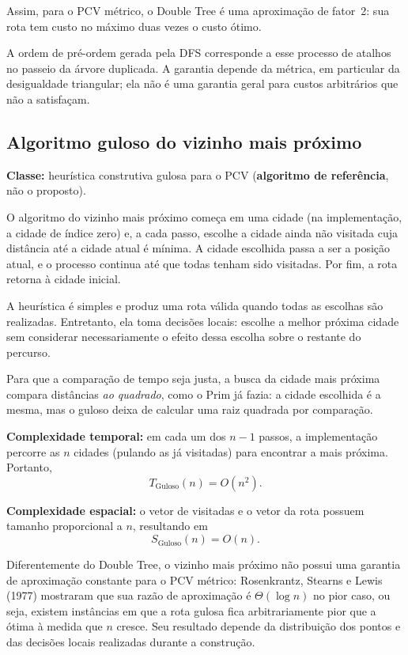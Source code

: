 \documentclass[11pt,a4paper]{article}
\renewcommand{\_}{\underscoreoriginal\allowbreak}
\begin{document}
Assim, para o PCV métrico, o Double Tree é uma aproximação de fator~2:
sua rota tem custo no máximo duas vezes o custo ótimo.

A ordem de pré-ordem gerada pela DFS corresponde a esse processo de
atalhos no passeio da árvore duplicada. A garantia depende da métrica, em
particular da desigualdade triangular; ela não é uma garantia geral para
custos arbitrários que não a satisfaçam.

\subsection{Algoritmo guloso do vizinho mais próximo}
\label{sec:guloso}

\textbf{Classe:} heurística construtiva gulosa para o PCV
(\textbf{algoritmo de referência}, não o proposto).

O algoritmo do vizinho mais próximo começa em uma cidade (na
implementação, a cidade de índice zero) e, a cada passo, escolhe a cidade
ainda não visitada cuja distância até a cidade atual é mínima. A cidade
escolhida passa a ser a posição atual, e o processo continua até que
todas tenham sido visitadas. Por fim, a rota retorna à cidade inicial.

A heurística é simples e produz uma rota válida quando todas as escolhas
são realizadas. Entretanto, ela toma decisões locais: escolhe a melhor
próxima cidade sem considerar necessariamente o efeito dessa escolha
sobre o restante do percurso.

Para que a comparação de tempo seja justa, a busca da cidade mais
próxima compara distâncias \emph{ao quadrado}, como o Prim já fazia: a
cidade escolhida é a mesma, mas o guloso deixa de calcular uma raiz
quadrada por comparação.

\textbf{Complexidade temporal:} em cada um dos $n-1$ passos, a
implementação percorre as $n$ cidades (pulando as já visitadas) para
encontrar a mais próxima. Portanto,
\[
  T_{\text{Guloso}}(n)=O(n^2).
\]

\textbf{Complexidade espacial:} o vetor de visitadas e o vetor da rota
possuem tamanho proporcional a $n$, resultando em
\[
  S_{\text{Guloso}}(n)=O(n).
\]

Diferentemente do Double Tree, o vizinho mais próximo não possui uma
garantia de aproximação constante para o PCV métrico: Rosenkrantz,
Stearns e Lewis (1977) mostraram que sua razão de aproximação é
$\Theta(\log n)$ no pior caso, ou seja, existem instâncias em que a rota
gulosa fica arbitrariamente pior que a ótima à medida que $n$ cresce.
Seu resultado depende da distribuição dos pontos e das decisões locais
realizadas durante a construção.
\end{document}
